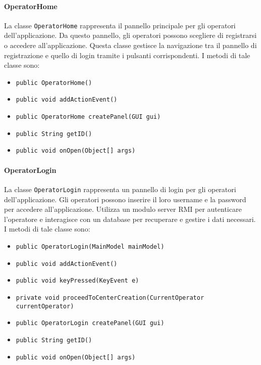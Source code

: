 \paragraph{OperatorHome}
La classe \texttt{OperatorHome} rappresenta il pannello principale per gli operatori dell'applicazione.
Da questo pannello, gli operatori possono scegliere di registrarsi o accedere all'applicazione. 
Questa classe gestisce la navigazione tra il pannello di registrazione e quello di login tramite i pulsanti corrispondenti.
I metodi di tale classe sono:
\begin{itemize}
    \item \texttt{public OperatorHome()}
    \item \texttt{public void addActionEvent()}
    \item \texttt{public OperatorHome createPanel(GUI gui)}
    \item \texttt{public String getID()}
    \item \texttt{public void onOpen(Object[] args)}
\end{itemize}

\paragraph{OperatorLogin}
La classe \texttt{OperatorLogin} rappresenta un pannello di login per gli operatori dell'applicazione.
Gli operatori possono inserire il loro username e la password per accedere all'applicazione. 
Utilizza un modulo server RMI per autenticare l'operatore e interagisce con un database per recuperare e gestire i dati necessari.
I metodi di tale classe sono:
\begin{itemize}
    \item \texttt{public OperatorLogin(MainModel mainModel)}
    \item \texttt{public void addActionEvent()}
    \item \texttt{public void keyPressed(KeyEvent e)}
    \item \texttt{private void proceedToCenterCreation(CurrentOperator currentOperator)}
    \item \texttt{public OperatorLogin createPanel(GUI gui)}
    \item \texttt{public String getID()}
    \item \texttt{public void onOpen(Object[] args)}
\end{itemize}

